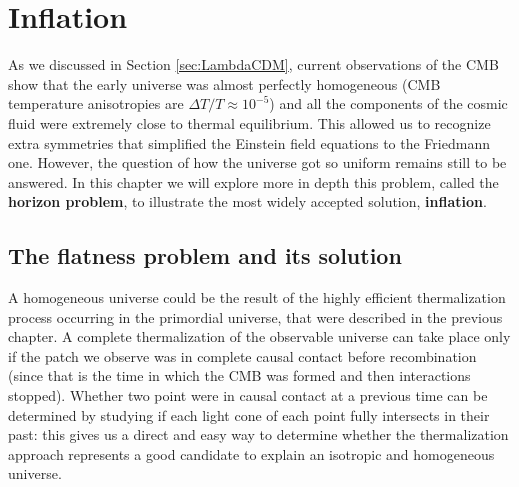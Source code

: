 \chapter{Inflation}
\label{chap:inflation}
As we discussed in Section \ref{sec:LambdaCDM}, current observations of the CMB show that the early universe was almost perfectly homogeneous (CMB temperature anisotropies are $\Delta T/T\approx 10^{-5}$) and all the components of the cosmic fluid were extremely close to thermal equilibrium. This allowed us to recognize extra symmetries that simplified the Einstein field equations to the Friedmann one. However, the question of how the universe got so uniform remains still to be answered. In this chapter we will explore more in depth this problem, called the \textbf{horizon problem}, to illustrate the most widely accepted solution, \textbf{inflation}.
\section{The flatness problem and its solution}
A homogeneous universe could be the result of the highly efficient thermalization process occurring in the primordial universe, that were described in the previous chapter. A complete thermalization of the observable universe can take place only if the patch we observe was in complete causal contact before recombination (since that is the time in which the CMB was formed and then interactions stopped). Whether two point were in causal contact at a previous time can be determined by studying if each light cone of each point fully intersects in their past: this gives us a direct and easy way to determine whether the thermalization approach represents a good candidate to explain an isotropic and homogeneous universe. 

